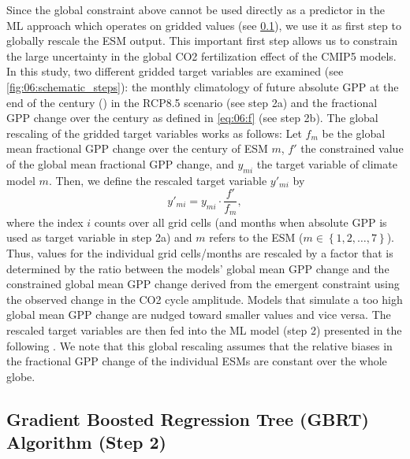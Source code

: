 Since the global constraint above cannot be used directly as a predictor in the
\ac{ML} approach which operates on gridded values (see
\cref{subsec:06:step_2}), we use it as first step to globally rescale the
\ac{ESM} output. This important first step allows us to constrain the large
uncertainty in the global \ac{CO2} fertilization effect of the \acs{CMIP}5
models. In this study, two different gridded target variables are examined (see
\cref{fig:06:schematic_steps}): the monthly climatology of future absolute
\ac{GPP} at the end of the  century () in the
\acs{RCP}8.5 scenario (see step 2a) and the fractional \acs{GPP} change over
the  century as defined in \cref{eq:06:f} (see step 2b). The global
rescaling of the gridded target variables works as follows: Let $f_m$ be the
global mean fractional \acs{GPP} change over the  century of \ac{ESM}
$m$, $f'$ the constrained value of the global mean fractional \ac{GPP} change,
and $y_{mi}$ the target variable of climate model $m$. Then, we define the
rescaled target variable $y'_{mi}$ by
\begin{equation}
  y'_{mi} = y_{mi} \cdot \frac{f'}{f_m},
  \label{eq:06:y}
\end{equation}
where the index $i$ counts over all grid cells (and months when absolute
\ac{GPP} is used as target variable in step 2a) and $m$ refers to the \ac{ESM}
($m \in \left\{ 1, 2, \ldots, 7 \right\}$). Thus, values for the individual
grid cells/months are rescaled by a factor that is determined by the ratio
between the models' global mean \ac{GPP} change and the constrained global mean
\ac{GPP} change derived from the \textcite{Wenzel2016} emergent constraint
using the observed change in the \ac{CO2} cycle amplitude. Models that simulate
a too high global mean \ac{GPP} change are nudged toward smaller values and
vice versa. The rescaled target variables are then fed into the \ac{ML} model
(step 2) presented in the following . We note that
this global rescaling assumes that the relative biases in the fractional
\ac{GPP} change of the individual \acp{ESM} are constant over the whole globe.


\subsection{Gradient Boosted Regression Tree (\acs{GBRT}) Algorithm (Step 2)}
\label{subsec:06:step_2}

